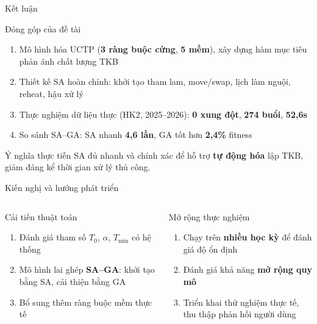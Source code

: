 \documentclass[aspectratio=169,10pt]{beamer}
\begin{document}
\begin{frame}{Kết luận}
\begin{block}{Đóng góp của đề tài}
\begin{enumerate}\setlength{\itemsep}{3pt}
  \item Mô hình hóa UCTP (\textbf{3 ràng buộc cứng}, \textbf{5 mềm}), xây dựng hàm mục tiêu phản ánh chất lượng TKB
  \item Thiết kế SA hoàn chỉnh: khởi tạo tham lam, move/swap, lịch làm nguội, reheat, hậu xử lý
  \item Thực nghiệm dữ liệu thực (HK2, 2025--2026): \textbf{0 xung đột}, \textbf{274 buổi}, \textbf{52,6s}
  \item So sánh SA--GA: SA nhanh \textbf{4,6 lần}, GA tốt hơn \textbf{2,4\%} fitness
\end{enumerate}
\end{block}

\vspace{0.2cm}
\begin{alertblock}{Ý nghĩa thực tiễn}
SA đủ nhanh và chính xác để hỗ trợ \textbf{tự động hóa} lập TKB, giảm đáng kể thời gian xử lý thủ công.
\end{alertblock}
\end{frame}

\begin{frame}{Kiến nghị và hướng phát triển}
\begin{columns}[T]
\begin{block}{Cải tiến thuật toán}
\begin{enumerate}
  \item Đánh giá tham số $T_0$, $\alpha$, $T_{\min}$ có hệ thống
  \item Mô hình lai ghép \textbf{SA--GA}: khởi tạo bằng SA, cải thiện bằng GA
  \item Bổ sung thêm ràng buộc mềm thực tế
\end{enumerate}
\end{block}

\begin{block}{Mở rộng thực nghiệm}
\begin{enumerate}
  \item Chạy trên \textbf{nhiều học kỳ} để đánh giá độ ổn định
  \item Đánh giá khả năng \textbf{mở rộng quy mô}
  \item Triển khai thử nghiệm thực tế, thu thập phản hồi người dùng
\end{enumerate}
\end{block}
\end{columns}
\end{frame}
\end{document}
